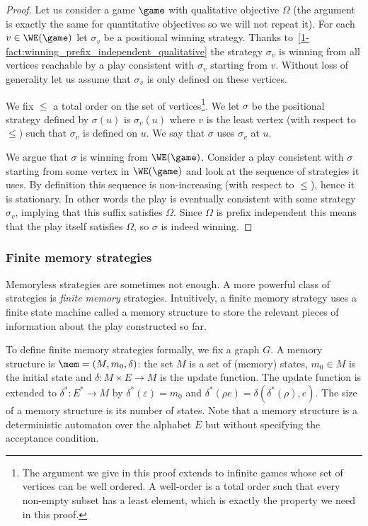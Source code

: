 \begin{proof}
Let us consider a game $\game$ with qualitative objective $\Omega$ (the argument is exactly the same for quantitative objectives so we will not repeat it).
For each $v \in \WE(\game)$ let $\sigma_v$ be a positional winning strategy.
Thanks to~\cref{1-fact:winning_prefix_independent_qualitative}
the strategy $\sigma_v$ is winning from all vertices reachable by a play consistent with $\sigma_v$ starting from $v$.
Without loss of generality let us assume that $\sigma_v$ is only defined on these vertices.

We fix $\le$ a total order on the set of vertices\footnote{The argument we give in this proof extends to infinite games whose set of vertices can be well ordered. A well-order is a total order such that every non-empty subset has a least element, which is exactly the property we need in this proof.}.
We let $\sigma$ be the positional strategy defined by $\sigma(u)$ is $\sigma_v(u)$ where $v$ is the least vertex (with respect to $\le$) such that $\sigma_v$ is defined on $u$. We say that $\sigma$ uses $\sigma_v$ at $u$.

We argue that $\sigma$ is winning from $\WE(\game)$. 
Consider a play consistent with $\sigma$ starting from some vertex in $\WE(\game)$ and look at the sequence of strategies it uses.
By definition this sequence is non-increasing (with respect to $\le$), hence it is stationary.
In other words the play is eventually consistent with some strategy $\sigma_v$, implying that this suffix satisfies $\Omega$.
Since $\Omega$ is prefix independent this means that the play itself satisfies $\Omega$, so $\sigma$ is indeed winning.
\end{proof}

\subsubsection*{Finite memory strategies}\label{1-finite memory}
Memoryless strategies are sometimes not enough. 
A more powerful class of strategies is \textit{finite memory} strategies.
Intuitively, a finite memory strategy uses a finite state machine called a memory structure 
to store the relevant pieces of information about the play constructed so far.

To define finite memory strategies formally, we fix a graph $G$.
A memory structure is $\mem = (M, m_0, \delta)$: the set $M$ is a set of (memory) states, 
$m_0 \in M$ is the initial state and $\delta : M \times E \to M$ is the update function.
The update function is extended to $\delta^* : E^* \to M$ by 
$\delta^*(\varepsilon) = m_0$ and $\delta^* (\rho e) = \delta(\delta^*(\rho), e)$.
The size of a memory structure is its number of states.
Note that a memory structure is a deterministic automaton over the alphabet $E$ but without specifying the acceptance condition.

